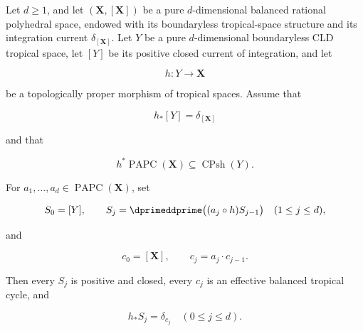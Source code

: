 \providecommand{\an}{\mathrm{an}}

\begin{proposition}\label{prop:p053-projection-recursion-repaired-candidate}
Let \(d\geq1\), and let \((\mathbf X,[\mathbf X])\) be a pure
\(d\)-dimensional balanced rational polyhedral space, endowed with its
boundaryless tropical-space structure and its integration current
\(\delta_{[\mathbf X]}\).  Let \(Y\) be a pure \(d\)-dimensional
boundaryless CLD tropical space, let \([Y]\) be its positive closed current
of integration, and let

\[
 h:Y\longrightarrow\mathbf X
\]

be a topologically proper morphism of tropical spaces.  Assume that

\begin{equation}
 h_*[Y]=\delta_{[\mathbf X]}
 \label{eq:p053-repaired-top-calibration}
\end{equation}

and that

\begin{equation}
 h^*\operatorname{PAPC}(\mathbf X)
 \subseteq \operatorname{CPsh}(Y).
 \label{eq:p053-repaired-psh-pullback}
\end{equation}

For \(a_1,\ldots,a_d\in\operatorname{PAPC}(\mathbf X)\), set

\begin{equation}
 S_0=[Y],\qquad
 S_j=\dprimeddprime\bigl((a_j\circ h)S_{j-1}\bigr)
 \quad (1\leq j\leq d),
 \label{eq:p053-repaired-source-recursion}
\end{equation}

and

\begin{equation}
 c_0=[\mathbf X],\qquad c_j=a_j\cdot c_{j-1}.
 \label{eq:p053-repaired-target-recursion}
\end{equation}

Then every \(S_j\) is positive and closed, every \(c_j\) is an effective
balanced tropical cycle, and

\begin{equation}
 h_*S_j=\delta_{c_j}
 \quad (0\leq j\leq d).
 \label{eq:p053-repaired-intermediate-pushforward}
\end{equation}


\end{proposition}
